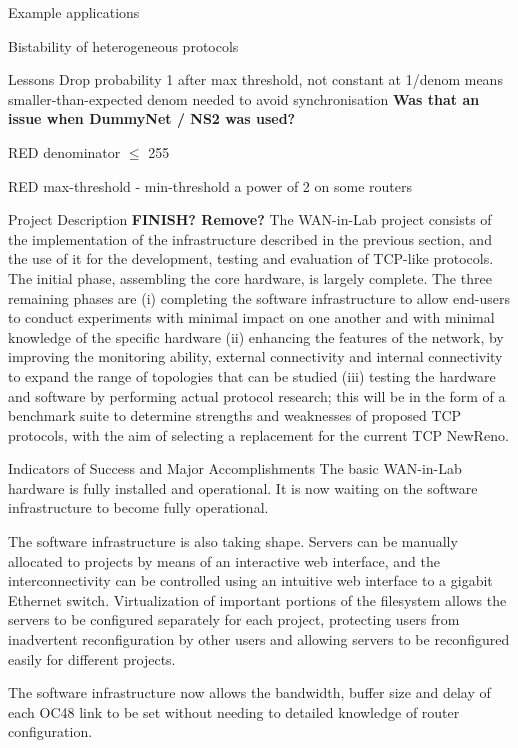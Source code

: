 \documentclass{IEEEtran}
\begin{document}
\begin{section}{Example applications}
\begin{subsection}{Bistability of heterogeneous protocols}
\begin{subsubsection}{Lessons}
Drop probability 1 after max threshold, not constant at 1/denom means
smaller-than-expected denom needed to avoid synchronisation
{\bf Was that an issue when DummyNet / NS2 was used?}

RED denominator $\le$ 255

RED max-threshold - min-threshold a power of 2 on some routers
\end{subsubsection}

\end{subsection}

\end{section}


\begin{section}{Project Description {\bf FINISH? Remove?} }
The WAN-in-Lab project consists of the implementation of the
infrastructure described in the previous section, and the use of it
for the development, testing and evaluation of TCP-like protocols.
The initial phase, assembling the core hardware, is largely complete.
The three remaining phases are (i) completing the software infrastructure
to allow end-users to conduct experiments with minimal impact on one
another and with minimal knowledge of the specific hardware  (ii)
enhancing the features of the network, by improving the monitoring
ability, external connectivity and internal connectivity to expand the
range of topologies that can be studied  (iii) testing the hardware and
software by performing actual protocol research; this will be in the form
of a benchmark suite to determine strengths and weaknesses of proposed
TCP protocols, with the aim of selecting a replacement for the current
TCP NewReno.

\end{section}


\begin{section}{Indicators of Success and Major Accomplishments}
The basic WAN-in-Lab hardware is fully installed and operational.  It is
now waiting on the software infrastructure to become fully operational.

The software infrastructure is also taking shape.  Servers can be manually
allocated to projects by means of an interactive web interface, and the
interconnectivity can be controlled using an intuitive web interface
to a gigabit Ethernet switch.  Virtualization of important portions of
the filesystem allows the servers to be configured separately for each
project, protecting users from inadvertent reconfiguration by other users
and allowing servers to be reconfigured easily for different projects.

The software infrastructure now allows the bandwidth, buffer size and
delay of each OC48 link to be set without needing to detailed knowledge
of router configuration.

\end{section}
\end{document}
